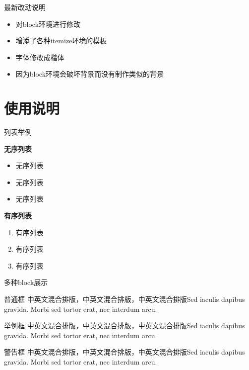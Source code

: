 \documentclass{beamer}
\begin{document}
\begin{frame}{最新改动说明}
	\begin{itemize}[<+-| structure@+>]
		\item 对block环境进行修改
		\item 增添了各种itemize环境的模板
        \item 字体修改成楷体
        \item 因为block环境会破坏背景而没有制作类似的背景
	\end{itemize}
\end{frame}

\section{使用说明}

\begin{frame}{列表举例}
	\begin{block}{\textbf{无序列表}}
		\begin{itemize}
			\item 无序列表
			\item 无序列表
			\item 无序列表
		\end{itemize}
	\end{block}
	
	\begin{block}{\textbf{有序列表}}
		\begin{enumerate}
			\item 有序列表
			\item 有序列表
			\item 有序列表
		\end{enumerate}
	\end{block}
\end{frame}

\begin{frame}{多种block展示}
	\begin{block}{普通框}
		中英文混合排版，中英文混合排版，中英文混合排版Sed iaculis
		dapibus gravida. Morbi sed tortor erat, nec interdum arcu. 
	\end{block}
	\begin{exampleblock}{举例框}
		中英文混合排版，中英文混合排版，中英文混合排版Sed iaculis
		dapibus gravida. Morbi sed tortor erat, nec interdum arcu.
	\end{exampleblock}
	\begin{alertblock}{警告框}
		中英文混合排版，中英文混合排版，中英文混合排版Sed iaculis
		dapibus gravida. Morbi sed tortor erat, nec interdum arcu.
	\end{alertblock}
\end{frame}
\end{document}
